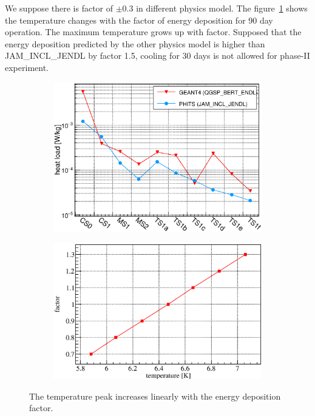 We suppose there is factor of $\pm$0.3 in different physics model.
The figure~\ref{5factor} shows the temperature changes with the factor of energy deposition for 90 day operation.
The maximum temperature grows up with factor.
Supposed that the energy deposition predicted by the other physics model is higher than JAM\_INCL\_JENDL by factor 1.5, cooling for 30 days is not allowed for phase-II experiment.
\begin{figure}[H]
 \begin{subfigure}{0.3\textwidth}
 \centering
 \includegraphics[scale=0.45]{chapter5/fig/g4phs.eps}
 \end{subfigure}
 \hspace{0.2\textwidth}
 \begin{subfigure}{0.3\textwidth}
 \centering
 \includegraphics[scale=0.45]{chapter6/fig/factor.eps}
 \end{subfigure}
 \caption{ The temperature peak increases linearly with the energy deposition factor.}
 \label{5factor}
\end{figure}

